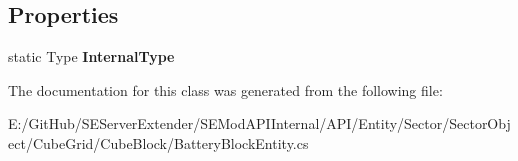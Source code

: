 \subsection*{Properties}
\begin{DoxyCompactItemize}
\item 
\hypertarget{class_s_e_mod_a_p_i_internal_1_1_a_p_i_1_1_entity_1_1_sector_1_1_sector_object_1_1_cube_grid_1_1d727a14220007a281c99a2418d07055f_a6dc432a54228c889d71015b3480425bb}{}static Type {\bfseries Internal\+Type}\label{class_s_e_mod_a_p_i_internal_1_1_a_p_i_1_1_entity_1_1_sector_1_1_sector_object_1_1_cube_grid_1_1d727a14220007a281c99a2418d07055f_a6dc432a54228c889d71015b3480425bb}

\end{DoxyCompactItemize}


The documentation for this class was generated from the following file\+:\begin{DoxyCompactItemize}
\item 
E\+:/\+Git\+Hub/\+S\+E\+Server\+Extender/\+S\+E\+Mod\+A\+P\+I\+Internal/\+A\+P\+I/\+Entity/\+Sector/\+Sector\+Object/\+Cube\+Grid/\+Cube\+Block/Battery\+Block\+Entity.\+cs\end{DoxyCompactItemize}
